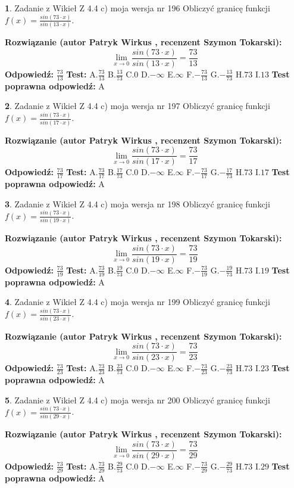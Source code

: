 \documentclass[12pt, a4paper]{article}
\theoremstyle{definition} %
\newtheorem{zad}{}
\newcommand{\zadStart}[1]{\begin{zad}#1\newline}
\newcommand{\zadStop}{\end{zad}}
\newcommand{\rozwStart}[2]{\noindent \textbf{Rozwiązanie (autor #1 , recenzent #2): }\newline}
\newcommand{\rozwStop}{\newline}
\newcommand{\odpStart}{\noindent \textbf{Odpowiedź:}\newline}
\newcommand{\odpStop}{\newline}
\newcommand{\testStart}{\noindent \textbf{Test:}\newline}
\newcommand{\testStop}{\newline}
\newcommand{\kluczStart}{\noindent \textbf{Test poprawna odpowiedź:}\newline}
\newcommand{\kluczStop}{\newline}
\begin{document}
\zadStart{Zadanie z Wikieł Z 4.4 c) moja wersja nr 196}
Obliczyć granicę funkcji $f(x)=\frac{sin(73\cdot x)}{sin(13\cdot x)}$.
\zadStop
\rozwStart{Patryk Wirkus}{Szymon Tokarski}
$$\lim\limits_{x\to 0}\frac{sin(73\cdot x)}{sin(13\cdot x)}=
\frac{73}{13}$$
\rozwStop
\odpStart
$\frac{73}{13}$
\odpStop
\testStart
A.$\frac{73}{13}$
B.$\frac{13}{73}$
C.$0$
D.$-\infty$
E.$\infty$
F.$-\frac{73}{13}$
G.$-\frac{13}{73}$
H.$73$
I.$13$
\testStop
\kluczStart
A
\kluczStop



\zadStart{Zadanie z Wikieł Z 4.4 c) moja wersja nr 197}
Obliczyć granicę funkcji $f(x)=\frac{sin(73\cdot x)}{sin(17\cdot x)}$.
\zadStop
\rozwStart{Patryk Wirkus}{Szymon Tokarski}
$$\lim\limits_{x\to 0}\frac{sin(73\cdot x)}{sin(17\cdot x)}=
\frac{73}{17}$$
\rozwStop
\odpStart
$\frac{73}{17}$
\odpStop
\testStart
A.$\frac{73}{17}$
B.$\frac{17}{73}$
C.$0$
D.$-\infty$
E.$\infty$
F.$-\frac{73}{17}$
G.$-\frac{17}{73}$
H.$73$
I.$17$
\testStop
\kluczStart
A
\kluczStop



\zadStart{Zadanie z Wikieł Z 4.4 c) moja wersja nr 198}
Obliczyć granicę funkcji $f(x)=\frac{sin(73\cdot x)}{sin(19\cdot x)}$.
\zadStop
\rozwStart{Patryk Wirkus}{Szymon Tokarski}
$$\lim\limits_{x\to 0}\frac{sin(73\cdot x)}{sin(19\cdot x)}=
\frac{73}{19}$$
\rozwStop
\odpStart
$\frac{73}{19}$
\odpStop
\testStart
A.$\frac{73}{19}$
B.$\frac{19}{73}$
C.$0$
D.$-\infty$
E.$\infty$
F.$-\frac{73}{19}$
G.$-\frac{19}{73}$
H.$73$
I.$19$
\testStop
\kluczStart
A
\kluczStop



\zadStart{Zadanie z Wikieł Z 4.4 c) moja wersja nr 199}
Obliczyć granicę funkcji $f(x)=\frac{sin(73\cdot x)}{sin(23\cdot x)}$.
\zadStop
\rozwStart{Patryk Wirkus}{Szymon Tokarski}
$$\lim\limits_{x\to 0}\frac{sin(73\cdot x)}{sin(23\cdot x)}=
\frac{73}{23}$$
\rozwStop
\odpStart
$\frac{73}{23}$
\odpStop
\testStart
A.$\frac{73}{23}$
B.$\frac{23}{73}$
C.$0$
D.$-\infty$
E.$\infty$
F.$-\frac{73}{23}$
G.$-\frac{23}{73}$
H.$73$
I.$23$
\testStop
\kluczStart
A
\kluczStop



\zadStart{Zadanie z Wikieł Z 4.4 c) moja wersja nr 200}
Obliczyć granicę funkcji $f(x)=\frac{sin(73\cdot x)}{sin(29\cdot x)}$.
\zadStop
\rozwStart{Patryk Wirkus}{Szymon Tokarski}
$$\lim\limits_{x\to 0}\frac{sin(73\cdot x)}{sin(29\cdot x)}=
\frac{73}{29}$$
\rozwStop
\odpStart
$\frac{73}{29}$
\odpStop
\testStart
A.$\frac{73}{29}$
B.$\frac{29}{73}$
C.$0$
D.$-\infty$
E.$\infty$
F.$-\frac{73}{29}$
G.$-\frac{29}{73}$
H.$73$
I.$29$
\testStop
\kluczStart
A
\kluczStop
\end{document}
